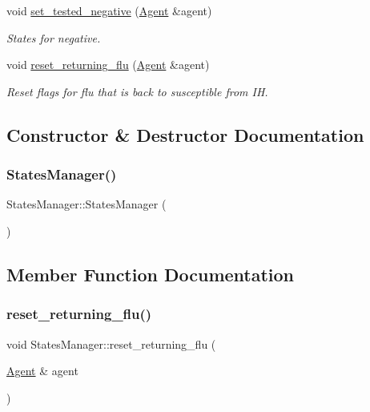 \begin{DoxyCompactItemize}
void \hyperlink{classStatesManager_a96264539e58617292fe8c94f7716ec8b}{set\+\_\+tested\+\_\+negative} (\hyperlink{classAgent}{Agent} \&agent)
\begin{DoxyCompactList}\small\item\em States for negative. \end{DoxyCompactList}\item 
void \hyperlink{classStatesManager_a8f95740774b07cd67d64119cfbadae6a}{reset\+\_\+returning\+\_\+flu} (\hyperlink{classAgent}{Agent} \&agent)
\begin{DoxyCompactList}\small\item\em Reset flags for flu that is back to susceptible from IH. \end{DoxyCompactList}\end{DoxyCompactItemize}


\subsection{Constructor \& Destructor Documentation}
\mbox{\label{classStatesManager_a9aa295a6122b9501a24e3ef4449c660f}} 
\subsubsection{\texorpdfstring{States\+Manager()}{StatesManager()}}
{\footnotesize\ttfamily States\+Manager\+::\+States\+Manager (\begin{DoxyParamCaption}{ }\end{DoxyParamCaption})\hspace{0.3cm}{\ttfamily [default]}}



\subsection{Member Function Documentation}
\mbox{\label{classStatesManager_a8f95740774b07cd67d64119cfbadae6a}} 
\subsubsection{\texorpdfstring{reset\+\_\+returning\+\_\+flu()}{reset\_returning\_flu()}}
{\footnotesize\ttfamily void States\+Manager\+::reset\+\_\+returning\+\_\+flu (\begin{DoxyParamCaption}\item[{\hyperlink{classAgent}{Agent} \&}]{agent }\end{DoxyParamCaption})}



